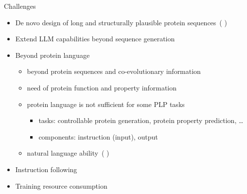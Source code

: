 \documentclass[dvipsnames,
hyperref={
	citecolor=blue,
	colorlinks=true,
	urlcolor=blue,
	linkcolor=,
}
]{beamer}
\let\oldcite\cite
\renewcommand{\cite}[1]{{\color{blue} \oldcite{#1}}}
\begin{document}
\begin{frame}{Challenges}%
	\begin{itemize}\setlength\itemsep{1.5em}
		\item De novo design of long and structurally plausible protein
		sequences~(\cite{ferruz2022protgpt2}) %
		\item Extend LLM capabilities beyond sequence generation
		\item Beyond protein language
		\begin{itemize}
			\item beyond protein sequences and co-evolutionary
			information
			\item need of protein function and property information
			\item protein language is not sufficient for some PLP tasks
			\begin{itemize}
				\item tasks: controllable protein generation, protein property prediction, \dots
				\item components: instruction (input), output
			\end{itemize}
			\item natural language ability~(\cite{xu2023protst,wang2023instructprotein})
		\end{itemize}
		\item Instruction following
		\item Training resource consumption
	\end{itemize}
\end{frame}

\end{document}
